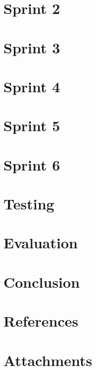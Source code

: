 \documentclass{report}
\begin{document}
\chapter{Sprint 2}


\chapter{Sprint 3}


\chapter{Sprint 4}


\chapter{Sprint 5}


\chapter{Sprint 6}


\chapter{Testing}



\chapter{Evaluation}


\chapter{Conclusion}


\chapter{References}


\chapter{Attachments}


\appendix

\end{document}
